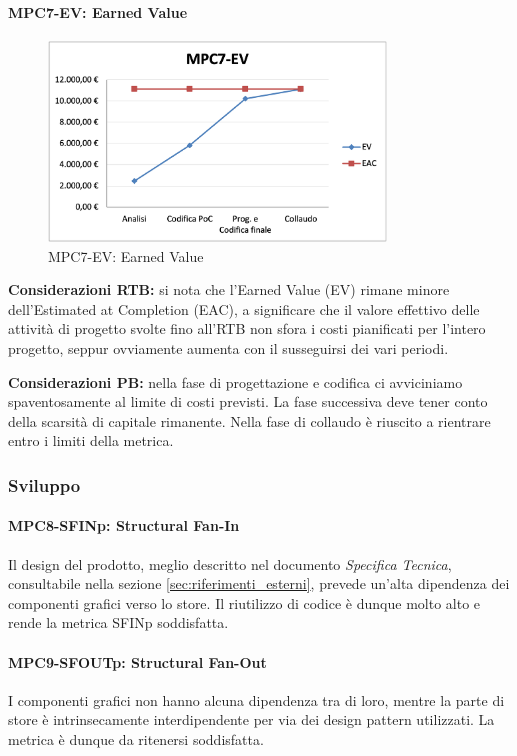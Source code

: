 \paragraph{MPC7-EV: Earned Value}
\begin{figure}[h!] 
    \centering
    \includegraphics[width=0.8\textwidth]{images/MPC7-EV.png}
    \caption{MPC7-EV: Earned Value}
\end{figure}
\noindent \textbf{Considerazioni RTB:} si nota che l'Earned Value (EV) rimane minore dell'Estimated at Completion (EAC), a significare che il valore effettivo delle attività di progetto svolte fino all'RTB non sfora i costi pianificati per l'intero progetto, seppur ovviamente aumenta con il susseguirsi dei vari periodi.

\vspace{0.5cm}
\noindent \textbf{Considerazioni PB:} nella fase di progettazione e codifica ci avviciniamo spaventosamente al limite di costi previsti. La fase successiva deve tener conto della scarsità di capitale rimanente. Nella fase di collaudo è riuscito a rientrare entro i limiti della metrica.

\subsubsection{Sviluppo} \label{sec:sviluppo}
\paragraph{MPC8-SFINp: Structural Fan-In}  
Il design del prodotto, meglio descritto nel documento \textit{Specifica Tecnica}, consultabile nella sezione \ref{sec:riferimenti_esterni}, prevede un'alta dipendenza dei componenti grafici verso lo store. Il riutilizzo di codice è dunque molto alto e rende la metrica SFINp soddisfatta.

\paragraph{MPC9-SFOUTp: Structural Fan-Out}
I componenti grafici non hanno alcuna dipendenza tra di loro, mentre la parte di store è intrinsecamente interdipendente per via dei design pattern utilizzati. La metrica è dunque da ritenersi soddisfatta.


